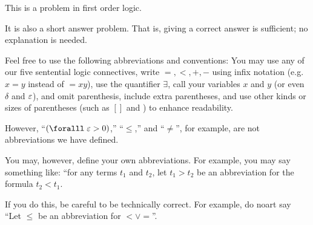 \begin{problem}
  This is a problem in first order logic.

  \step
  It is also a short answer problem.
  That is, giving a correct answer is sufficient;
  no explanation is needed.

  \step
  Feel free to use the following abbreviations and conventions:
  You may use any of our five sentential logic connectives,
  write $=, <, +, -$ using infix notation
  (e.g. $x = y$ instead of $= xy$), use the quantifier $\exists$,
  call your variables $x$ and $y$ (or even $\delta$ and $\varepsilon$),
  and omit parenthesis, include extra parentheses,
  and use other kinds or sizes of parentheses
  (such as $[ ]$ and ${}$) to enhance readability.

  \step
  However, ``$(\forall \eps > 0)$,'' ``$\le$,'' and ``$\ne$'',
  for example, are not abbreviations we have defined.

  \step
  You may, however, define your own abbreviations.
  For example, you may say something like:
  ``for any terms $t_1$ and $t_2$, let $t_1 > t_2$ be an abbreviation
  for the formula $t_2 < t_1$.

  \step
  If you do this, be careful to be technically correct.
  For example, do noart say
  ``Let $\le$ be an abbreviation for $< \lor =$''.
  
\end{problem}
